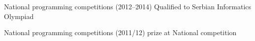 \begin{minipage}[t]{\linewidth}
{\alignRight\rSubtitleFont\bold National programming \alignRight competitions \light (2012--2014)}\newline
{\alignRight\largeContentFont\medium Qualified to Serbian Informatics \alignRight Olympiad}\newline

{\alignRight\rSubtitleFont\bold National programming \alignRight competitions \light (2011/12)}\newline
{\alignRight\largeContentFont\medium {} prize at National competition}
\end{minipage}\newline%
